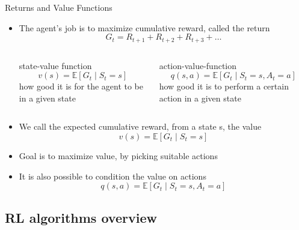 \documentclass[xcolor=dvipsnames]{beamer}
\begin{document}
\begin{frame}{Returns and Value Functions}
    \begin{itemize}
        \item The agent’s job is to maximize cumulative reward, called the \alert{return}
        \begin{equation*}
            G_t = R_{t+1} + R_{t+2} + R_{t+3} + \dots
        \end{equation*}
        \begin{columns}
            \begin{column}{0.5\textwidth}
                \centering
                state-value function
                \begin{equation*}
                    v(s) = \mathbb{E} [G_t \mid S_t = s]
                \end{equation*}
                how good it is for the agent to be in a given state
            \end{column}
            \begin{column}{0.5\textwidth}
                \centering
                action-value-function
                \begin{equation*}
                    q(s,a) = \mathbb{E} [G_t \mid S_t = s, A_t = a]
                \end{equation*}
                how good it is to perform a certain action in a given state
            \end{column}
        \end{columns}
        \item We call the expected cumulative reward, from a state s, the \alert{value}
        \begin{equation*}
            v(s) = \mathbb{E} [G_t \mid S_t = s]
        \end{equation*}
        \item Goal is to \alert{maximize value}, by picking suitable actions
        \item It is also possible to condition the value on \alert{actions}
        \begin{equation*}
            q(s,a) = \mathbb{E} [G_t \mid S_t = s, A_t = a]
        \end{equation*}
    \end{itemize}
\end{frame}

\subsection{RL algorithms overview}
\end{document}
